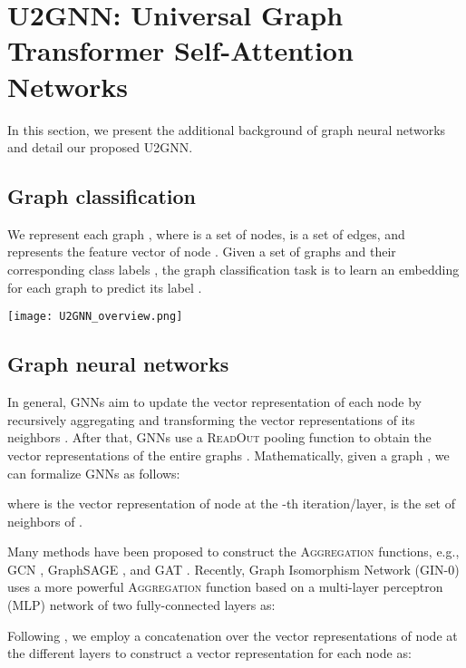 \documentclass[twoside,leqno,twocolumn]{article}
\newcommand{\citep}{\cite}
\begin{document}
\section{U2GNN: Universal Graph Transformer Self-Attention Networks}
\label{sec:ourmodel}


In this section, we present the additional background of graph neural networks and detail our proposed U2GNN.


\subsection{Graph classification} We represent each graph , where  is a set of nodes,  is a set of edges, and  represents the feature vector of node . 
Given a set of  graphs  and their corresponding class labels , the graph classification task is to learn an embedding  for each graph  to predict its label .



\begin{figure*}[!ht]
\centering
\texttt{[image: U2GNN\_overview.png]}
\label{fig:U2GNN}
\end{figure*}


\subsection{Graph neural networks} 
In general, GNNs aim to update the vector representation of each node by recursively aggregating and transforming the vector representations of its neighbors \citep{kipf2017semi,hamilton2017inductive,velickovic2018graph}. 
After that, GNNs use a \textsc{ReadOut} pooling function to obtain the vector representations of the entire graphs \citep{Gilmer2017,zhang2018end,Ying2018diffpool,verma2018graph,xu2019powerful}.
Mathematically, given a graph , we can formalize GNNs as follows:


where  is the vector representation of node  at the -th iteration/layer,  is the set of neighbors of .

Many methods have been proposed to construct the \textsc{Aggregation} functions, e.g., GCN \citep{kipf2017semi}, GraphSAGE \citep{hamilton2017inductive}, and GAT \citep{velickovic2018graph}. Recently, Graph Isomorphism Network (GIN-0) \citep{xu2019powerful} uses a more powerful \textsc{Aggregation} function based on a multi-layer perceptron (MLP) network of two fully-connected layers as:

Following \citep{xu2019powerful}, we employ a concatenation over the vector representations of node  at the different layers to construct a vector representation  for each node  as:
\end{document}
